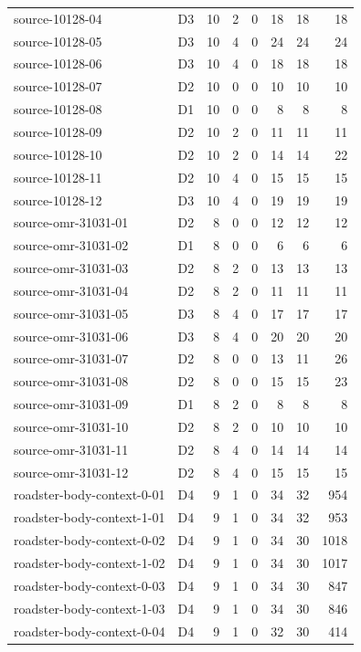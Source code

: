 \begin{longtable}{llrrrrrr}
source-10128-04 & D3 & 10 & 2 & 0 & 18 & 18 & 18\\
source-10128-05 & D3 & 10 & 4 & 0 & 24 & 24 & 24\\
source-10128-06 & D3 & 10 & 4 & 0 & 18 & 18 & 18\\
source-10128-07 & D2 & 10 & 0 & 0 & 10 & 10 & 10\\
source-10128-08 & D1 & 10 & 0 & 0 & 8 & 8 & 8\\
source-10128-09 & D2 & 10 & 2 & 0 & 11 & 11 & 11\\
source-10128-10 & D2 & 10 & 2 & 0 & 14 & 14 & 22\\
source-10128-11 & D2 & 10 & 4 & 0 & 15 & 15 & 15\\
source-10128-12 & D3 & 10 & 4 & 0 & 19 & 19 & 19\\
source-omr-31031-01 & D2 & 8 & 0 & 0 & 12 & 12 & 12\\
source-omr-31031-02 & D1 & 8 & 0 & 0 & 6 & 6 & 6\\
source-omr-31031-03 & D2 & 8 & 2 & 0 & 13 & 13 & 13\\
source-omr-31031-04 & D2 & 8 & 2 & 0 & 11 & 11 & 11\\
source-omr-31031-05 & D3 & 8 & 4 & 0 & 17 & 17 & 17\\
source-omr-31031-06 & D3 & 8 & 4 & 0 & 20 & 20 & 20\\
source-omr-31031-07 & D2 & 8 & 0 & 0 & 13 & 11 & 26\\
source-omr-31031-08 & D2 & 8 & 0 & 0 & 15 & 15 & 23\\
source-omr-31031-09 & D1 & 8 & 2 & 0 & 8 & 8 & 8\\
source-omr-31031-10 & D2 & 8 & 2 & 0 & 10 & 10 & 10\\
source-omr-31031-11 & D2 & 8 & 4 & 0 & 14 & 14 & 14\\
source-omr-31031-12 & D2 & 8 & 4 & 0 & 15 & 15 & 15\\
roadster-body-context-0-01 & D4 & 9 & 1 & 0 & 34 & 32 & 954\\
roadster-body-context-1-01 & D4 & 9 & 1 & 0 & 34 & 32 & 953\\
roadster-body-context-0-02 & D4 & 9 & 1 & 0 & 34 & 30 & 1018\\
roadster-body-context-1-02 & D4 & 9 & 1 & 0 & 34 & 30 & 1017\\
roadster-body-context-0-03 & D4 & 9 & 1 & 0 & 34 & 30 & 847\\
roadster-body-context-1-03 & D4 & 9 & 1 & 0 & 34 & 30 & 846\\
roadster-body-context-0-04 & D4 & 9 & 1 & 0 & 32 & 30 & 414\\

\end{longtable}
